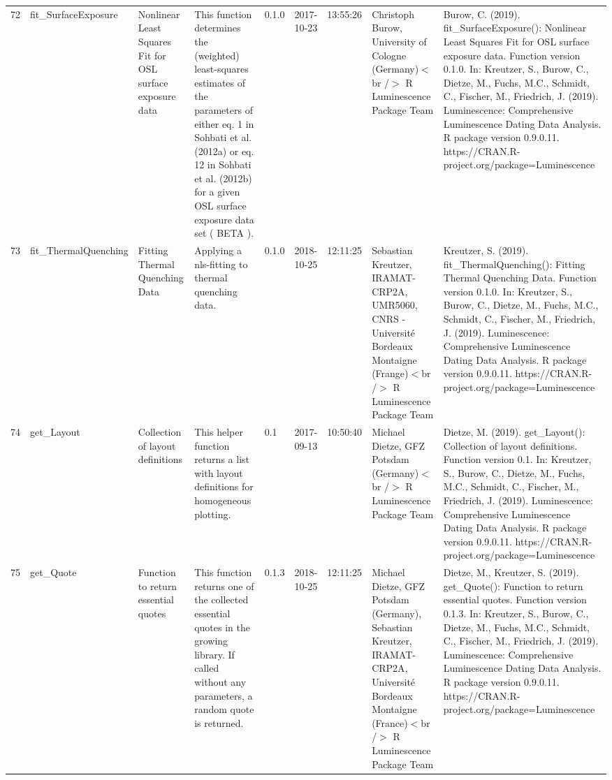 \begin{table}[ht]
\begin{tabular}{rllllllll}
 \\ 
  72 & fit\_SurfaceExposure & Nonlinear Least Squares Fit for OSL surface exposure data & This function determines the (weighted) least-squares estimates of the parameters of either eq. 1 in  Sohbati et al. (2012a)  or eq. 12 in Sohbati et al. (2012b)  for a given OSL surface exposure data set ( BETA ). & 0.1.0 & 2017-10-23 & 13:55:26
 & Christoph Burow, University of Cologne (Germany)$<$br /$>$  R Luminescence Package Team & Burow, C. (2019). fit\_SurfaceExposure(): Nonlinear Least Squares Fit for OSL surface exposure data. Function version 0.1.0. In: Kreutzer, S., Burow, C., Dietze, M., Fuchs, M.C., Schmidt, C., Fischer, M., Friedrich, J. (2019). Luminescence: Comprehensive Luminescence Dating Data Analysis. R package version 0.9.0.11. https://CRAN.R-project.org/package=Luminescence
 \\ 
  73 & fit\_ThermalQuenching & Fitting Thermal Quenching Data & Applying a nls-fitting to thermal quenching data. & 0.1.0 & 2018-10-25 & 12:11:25
 & Sebastian Kreutzer, IRAMAT-CRP2A, UMR5060, CNRS - Université Bordeaux Montaigne (Frange)$<$br /$>$  R Luminescence Package Team & Kreutzer, S. (2019). fit\_ThermalQuenching(): Fitting Thermal Quenching Data. Function version 0.1.0. In: Kreutzer, S., Burow, C., Dietze, M., Fuchs, M.C., Schmidt, C., Fischer, M., Friedrich, J. (2019). Luminescence: Comprehensive Luminescence Dating Data Analysis. R package version 0.9.0.11. https://CRAN.R-project.org/package=Luminescence
 \\ 
  74 & get\_Layout & Collection of layout definitions & This helper function returns a list with layout definitions for homogeneous plotting. & 0.1 & 2017-09-13 & 10:50:40
 & Michael Dietze, GFZ Potsdam (Germany)$<$br /$>$  R Luminescence Package Team & Dietze, M. (2019). get\_Layout(): Collection of layout definitions. Function version 0.1. In: Kreutzer, S., Burow, C., Dietze, M., Fuchs, M.C., Schmidt, C., Fischer, M., Friedrich, J. (2019). Luminescence: Comprehensive Luminescence Dating Data Analysis. R package version 0.9.0.11. https://CRAN.R-project.org/package=Luminescence
 \\ 
  75 & get\_Quote & Function to return essential quotes & This function returns one of the collected essential quotes in the growing library. If called without any parameters, a random quote is returned. & 0.1.3 & 2018-10-25 & 12:11:25
 & Michael Dietze, GFZ Potsdam (Germany), Sebastian Kreutzer, IRAMAT-CRP2A, Université Bordeaux Montaigne (France)$<$br /$>$  R Luminescence Package Team & Dietze, M., Kreutzer, S. (2019). get\_Quote(): Function to return essential quotes. Function version 0.1.3. In: Kreutzer, S., Burow, C., Dietze, M., Fuchs, M.C., Schmidt, C., Fischer, M., Friedrich, J. (2019). Luminescence: Comprehensive Luminescence Dating Data Analysis. R package version 0.9.0.11. https://CRAN.R-project.org/package=Luminescence

\end{tabular}
\end{table}
